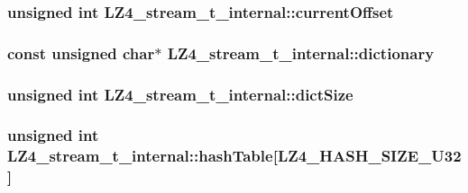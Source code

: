 \subsubsection[{current\+Offset}]{\setlength{\rightskip}{0pt plus 5cm}unsigned int L\+Z4\+\_\+stream\+\_\+t\+\_\+internal\+::current\+Offset}\label{struct_l_z4__stream__t__internal_a22283b1308210ae2916e67b5f0f6c72d}
\hypertarget{struct_l_z4__stream__t__internal_ad2609dc858757d096df15c144f6f710a}{}
\subsubsection[{dictionary}]{\setlength{\rightskip}{0pt plus 5cm}const unsigned char$\ast$ L\+Z4\+\_\+stream\+\_\+t\+\_\+internal\+::dictionary}\label{struct_l_z4__stream__t__internal_ad2609dc858757d096df15c144f6f710a}
\hypertarget{struct_l_z4__stream__t__internal_a2414cc6dbd4a6664bd012d439df1e830}{}
\subsubsection[{dict\+Size}]{\setlength{\rightskip}{0pt plus 5cm}unsigned int L\+Z4\+\_\+stream\+\_\+t\+\_\+internal\+::dict\+Size}\label{struct_l_z4__stream__t__internal_a2414cc6dbd4a6664bd012d439df1e830}
\hypertarget{struct_l_z4__stream__t__internal_a822eb4986a8d75266ff28ab2c8905c25}{}
\subsubsection[{hash\+Table}]{\setlength{\rightskip}{0pt plus 5cm}unsigned int L\+Z4\+\_\+stream\+\_\+t\+\_\+internal\+::hash\+Table\mbox{[}{\bf L\+Z4\+\_\+\+H\+A\+S\+H\+\_\+\+S\+I\+Z\+E\+\_\+\+U32}\mbox{]}}\label{struct_l_z4__stream__t__internal_a822eb4986a8d75266ff28ab2c8905c25}
\hypertarget{struct_l_z4__stream__t__internal_aa37594c27fdfa2bdfd4176fd599819ce}{}
